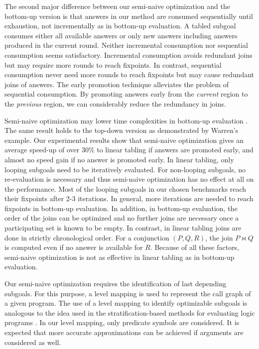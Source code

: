 \documentclass{tlp}
\begin{document}
The second major difference between our semi-naive optimization and the bottom-up version is that answers in our method are consumed sequentially until exhaustion, not incrementally as in bottom-up evaluation. A tabled subgoal consumes either all available answers or only new answers including answers produced in the current round. Neither incremental consumption nor sequential consumption seems satisfactory. Incremental consumption avoids redundant joins but may require more rounds to reach fixpoints. In contrast, sequential consumption never need more rounds to reach fixpoints but may cause redundant joins of answers. The early promotion technique alleviates the problem of sequential consumption. By promoting answers early from the {\it current} region to the {\it previous} region, we can considerably reduce the redundancy in joins.

Semi-naive optimization may lower time complexities in bottom-up evaluation \cite{Banc86}. The same result holds to the top-down version as demonstrated by Warren's example. Our experimental results show that semi-naive optimization gives an average speed-up of over $30\%$ to linear tabling if answers are promoted early, and almost no speed gain if no answer is promoted early. In linear tabling, only looping subgoals need to be iteratively evaluated. For non-looping subgoals, no re-evaluation is necessary and thus semi-naive optimization has no effect at all on the performance. Most of the looping subgoals in our chosen benchmarks reach their fixpoints after 2-3 iterations. In general, more iterations are needed to reach fixpoints in bottom-up evaluation. In addition, in bottom-up evaluation, the order of the joins can be optimized and no further joins are necessary once a participating set is known to be empty. In contrast, in linear tabling joins are done in strictly chronological order. For a conjunction $(P,Q,R)$, the join $P\Join Q$ is computed even if no answer is available for $R$. Because of all these factors, semi-naive optimization is not as effective in linear tabling as in bottom-up evaluation. 

Our semi-naive optimization requires the identification of last depending subgoals. For this purpose, a level mapping is used to represent the call graph of a given program. The use of a level mapping to identify optimizable subgoals is analogous to the idea used in the stratification-based methods for evaluating logic programs \cite{Apt88,Chen96,Przymusinski89}. In our level mapping, only predicate symbols are considered. It is expected that more accurate approximations can be achieved if arguments are considered as well.
\end{document}

